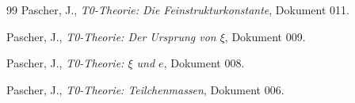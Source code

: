 	\begin{thebibliography}{99}
		Pascher, J., \emph{T0-Theorie: Die Feinstrukturkonstante}, Dokument 011.
		
		Pascher, J., \emph{T0-Theorie: Der Ursprung von $\xi$}, Dokument 009.
		
		Pascher, J., \emph{T0-Theorie: $\xi$ und $e$}, Dokument 008.
		
		Pascher, J., \emph{T0-Theorie: Teilchenmassen}, Dokument 006.
		
	\end{thebibliography}


